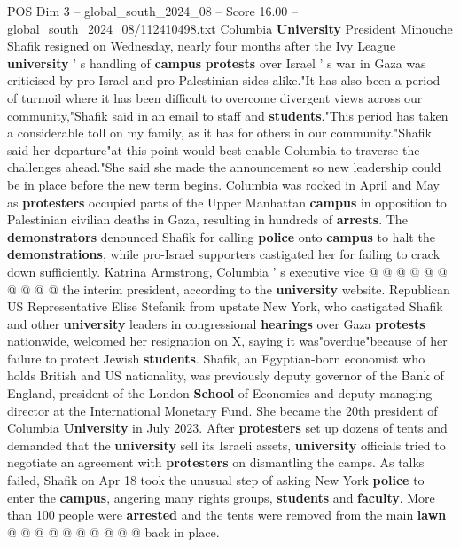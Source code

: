 \begin{textsample}{POS Dim 3 – global\_south\_2024\_08 – Score 16.00 – global\_south\_2024\_08/112410498.txt}  \label{ex:f3_pos_334}
Columbia \textbf{University} President Minouche Shafik resigned on Wednesday, nearly four months after the Ivy League \textbf{university} ' s handling of \textbf{campus} \textbf{protests} over Israel ' s war in Gaza was criticised by pro-Israel and pro-Palestinian sides alike."It has also been a period of turmoil where it has been difficult to overcome divergent views across our community,"Shafik said in an email to staff and \textbf{students}."This period has taken a considerable toll on my family, as it has for others in our community."Shafik said her departure"at this point would best enable Columbia to traverse the challenges ahead."She said she made the announcement so new leadership could be in place before the new term begins.
Columbia was rocked in April and May as \textbf{protesters} occupied parts of the Upper Manhattan \textbf{campus} in opposition to Palestinian civilian deaths in Gaza, resulting in hundreds of \textbf{arrests}.
The \textbf{demonstrators} denounced Shafik for calling \textbf{police} onto \textbf{campus} to halt the \textbf{demonstrations}, while pro-Israel supporters castigated her for failing to crack down sufficiently.
Katrina Armstrong, Columbia ' s executive vice @ @ @ @ @ @ @ @ @ @ the interim president, according to the \textbf{university} website.
Republican US Representative Elise Stefanik from upstate New York, who castigated Shafik and other \textbf{university} leaders in congressional \textbf{hearings} over Gaza \textbf{protests} nationwide, welcomed her resignation on X, saying it was"overdue"because of her failure to protect Jewish \textbf{students}.
Shafik, an Egyptian-born economist who holds British and US nationality, was previously deputy governor of the Bank of England, president of the London \textbf{School} of Economics and deputy managing director at the International Monetary Fund.
She became the 20th president of Columbia \textbf{University} in July 2023.
After \textbf{protesters} set up dozens of tents and demanded that the \textbf{university} sell its Israeli assets, \textbf{university} officials tried to negotiate an agreement with \textbf{protesters} on dismantling the camps.
As talks failed, Shafik on Apr 18 took the unusual step of asking New York \textbf{police} to enter the \textbf{campus}, angering many rights groups, \textbf{students} and \textbf{faculty}.
More than 100 people were \textbf{arrested} and the tents were removed from the main \textbf{lawn} @ @ @ @ @ @ @ @ @ @ back in place.

\end{textsample}
